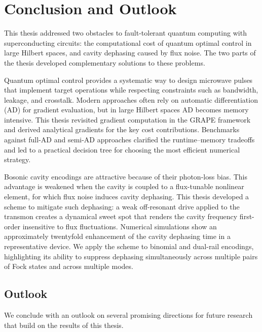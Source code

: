 \chapter{Conclusion and Outlook}
\label{chap:conclusion}

This thesis addressed two obstacles to fault-tolerant quantum
computing with superconducting circuits: the computational cost
of quantum optimal control in large Hilbert spaces, and cavity
dephasing caused by flux noise. The two parts of the thesis
developed complementary solutions to these problems.

Quantum optimal control provides a systematic way to design
microwave pulses that implement target operations while
respecting constraints such as bandwidth, leakage, and
crosstalk. Modern approaches often rely on automatic
differentiation (AD) for gradient evaluation, but in large
Hilbert spaces AD becomes memory intensive. This thesis
revisited gradient computation in the GRAPE framework and
derived analytical gradients for the key cost contributions.
Benchmarks against full-AD and semi-AD approaches clarified the
runtime--memory tradeoffs and led to a practical decision tree
for choosing the most efficient numerical strategy.

Bosonic cavity encodings are attractive because of their
photon-loss bias. This advantage is weakened when the cavity is
coupled to a flux-tunable nonlinear element, for which flux
noise induces cavity dephasing. This thesis developed a scheme
to mitigate such dephasing: a weak off-resonant drive applied
to the transmon creates a dynamical sweet spot that renders the
cavity frequency first-order insensitive to flux fluctuations.
Numerical simulations show an approximately twentyfold
enhancement of the cavity dephasing time in a representative
device. We apply the scheme to binomial and dual-rail encodings,
highlighting its ability to suppress dephasing simultaneously
across multiple pairs of Fock states and across multiple modes.

\section*{Outlook}

We conclude with an outlook on several promising directions
for future research that build on the results of this thesis.

